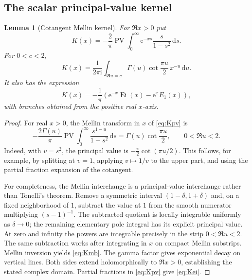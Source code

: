 \documentclass[11pt,a4paper]{article}
\numberwithin{equation}{section}
\newtheorem{lemma}[theorem]{Lemma}
\theoremstyle{definition}
\theoremstyle{remark}
\newcommand{\ii}{\mathrm i}
\newcommand{\e}{\mathrm e}
\newcommand{\dd}{\,\mathrm d}
\newcommand{\PV}{\operatorname{PV}}
\DeclareMathOperator{\Ei}{Ei}
\begin{document}
\subsection{The scalar principal-value kernel}
\begin{lemma}[Cotangent Mellin kernel]
\label{lem:kernel}
For $\Re x>0$ put
\begin{equation}
 K(x)=-\frac2\pi\PV\int_0^\infty
             \e^{-xs}\frac{s}{1-s^2}\dd s.
 \label{eq:Kpv}
\end{equation}
For $0<c<2$,
\begin{equation}
 K(x)=\frac1{2\pi\ii}\int_{\Re u=c}
       \Gamma(u)\cot\frac{\pi u}{2}\,x^{-u}\dd u.
 \label{eq:Kmb}
\end{equation}
It also has the expression
\begin{equation}
 K(x)=-\frac1\pi\left(\e^{-x}\Ei(x)-\e^x E_1(x)\right),
 \label{eq:Kei}
\end{equation}
with branches obtained from the positive real $x$-axis.
\end{lemma}
\begin{proof}
For real $x>0$, the Mellin transform in $x$ of \eqref{eq:Kpv} is
\[
 -\frac{2\Gamma(u)}\pi\PV\int_0^\infty
           \frac{s^{1-u}}{1-s^2}\dd s
 =\Gamma(u)\cot\frac{\pi u}{2},\qquad 0<\Re u<2.
\]
Indeed, with $v=s^2$, the principal value is
$-\frac\pi2\cot(\pi u/2)$. This follows, for example, by splitting at
$v=1$, applying $v\mapsto1/v$ to the upper part, and using the partial
fraction expansion of the cotangent.

For completeness, the Mellin interchange is a principal-value
interchange rather than Tonelli's theorem. Remove a symmetric interval
$(1-\delta,1+\delta)$ and, on a fixed neighborhood of $1$, subtract the
value at $1$ from the smooth numerator multiplying $(s-1)^{-1}$. The
subtracted quotient is locally integrable uniformly as $\delta\to0$;
the remaining elementary pole integral has its explicit principal
value. At zero and infinity the powers are integrable precisely in the
strip $0<\Re u<2$. The same subtraction works after integrating in
$x$ on compact Mellin substrips. Mellin inversion yields
\eqref{eq:Kmb}. The gamma factor gives exponential decay on vertical
lines. Both sides extend holomorphically to $\Re x>0$, establishing the
stated complex domain. Partial fractions in \eqref{eq:Kpv} give
\eqref{eq:Kei}.
\end{proof}
\end{document}
